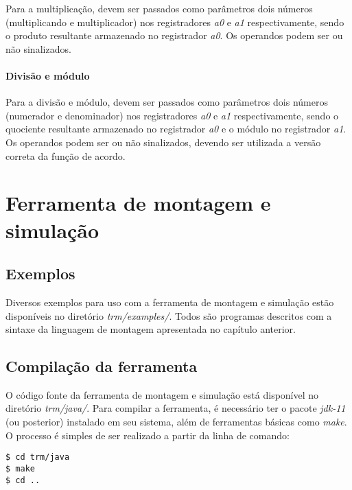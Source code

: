 \documentclass[11pt,a4paper]{report}
\begin{document}
Para a multiplicação, devem ser passados como parâmetros dois números
(multiplicando e multiplicador) nos registradores \textit{a0} e \textit{a1}
respectivamente, sendo o produto resultante armazenado no registrador
\textit{a0}. Os operandos podem ser ou não sinalizados.



\subsubsection{Divisão e módulo}

Para a divisão e módulo, devem ser passados como parâmetros dois números
(numerador e denominador) nos registradores \textit{a0} e \textit{a1}
respectivamente, sendo o quociente resultante armazenado no registrador
\textit{a0} e o módulo no registrador \textit{a1}. Os operandos podem
ser ou não sinalizados, devendo ser utilizada a versão correta da
função de acordo.



\chapter{Ferramenta de montagem e simulação}

\section{Exemplos}

Diversos exemplos para uso com a ferramenta de montagem e simulação
estão disponíveis no diretório \textit{trm/examples/}. Todos são
programas descritos com a sintaxe da linguagem de montagem apresentada
no capítulo anterior.

\section{Compilação da ferramenta}

O código fonte da ferramenta de montagem e simulação está disponível no
diretório \textit{trm/java/}. Para compilar a ferramenta, é necessário
ter o pacote \textit{jdk-11} (ou posterior) instalado em seu sistema,
além de ferramentas básicas como \textit{make}. O processo é simples de
ser realizado a partir da linha de comando:

\begin{verbatim}
$ cd trm/java
$ make
$ cd ..
\end{verbatim}
\end{document}

